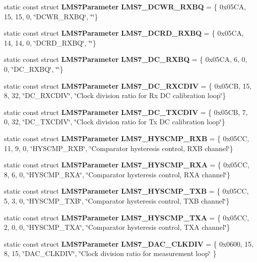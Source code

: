 \begin{DoxyCompactItemize}
\item 
static const struct {\bf L\+M\+S7\+Parameter} {\bf L\+M\+S7\+\_\+\+D\+C\+W\+R\+\_\+\+R\+X\+BQ} = \{ 0x05\+C\+A, 15, 15, 0, \char`\"{}\+D\+C\+W\+R\+\_\+\+R\+X\+B\+Q\char`\"{}, \char`\"{}\char`\"{}\}
\item 
static const struct {\bf L\+M\+S7\+Parameter} {\bf L\+M\+S7\+\_\+\+D\+C\+R\+D\+\_\+\+R\+X\+BQ} = \{ 0x05\+C\+A, 14, 14, 0, \char`\"{}\+D\+C\+R\+D\+\_\+\+R\+X\+B\+Q\char`\"{}, \char`\"{}\char`\"{}\}
\item 
static const struct {\bf L\+M\+S7\+Parameter} {\bf L\+M\+S7\+\_\+\+D\+C\+\_\+\+R\+X\+BQ} = \{ 0x05\+C\+A, 6, 0, 0, \char`\"{}\+D\+C\+\_\+\+R\+X\+B\+Q\char`\"{}, \char`\"{}\char`\"{}\}
\item 
static const struct {\bf L\+M\+S7\+Parameter} {\bf L\+M\+S7\+\_\+\+D\+C\+\_\+\+R\+X\+C\+D\+IV} = \{ 0x05\+C\+B, 15, 8, 32, \char`\"{}\+D\+C\+\_\+\+R\+X\+C\+D\+I\+V\char`\"{}, \char`\"{}\+Clock division ratio for Rx D\+C calibration loop\char`\"{}\}
\item 
static const struct {\bf L\+M\+S7\+Parameter} {\bf L\+M\+S7\+\_\+\+D\+C\+\_\+\+T\+X\+C\+D\+IV} = \{ 0x05\+C\+B, 7, 0, 32, \char`\"{}\+D\+C\+\_\+\+T\+X\+C\+D\+I\+V\char`\"{}, \char`\"{}\+Clock division ratio for Tx D\+C calibration loop\char`\"{}\}
\item 
static const struct {\bf L\+M\+S7\+Parameter} {\bf L\+M\+S7\+\_\+\+H\+Y\+S\+C\+M\+P\+\_\+\+R\+XB} = \{ 0x05\+C\+C, 11, 9, 0, \char`\"{}\+H\+Y\+S\+C\+M\+P\+\_\+\+R\+X\+B\char`\"{}, \char`\"{}\+Comparator hysteresis control, R\+X\+B channel\char`\"{}\}
\item 
static const struct {\bf L\+M\+S7\+Parameter} {\bf L\+M\+S7\+\_\+\+H\+Y\+S\+C\+M\+P\+\_\+\+R\+XA} = \{ 0x05\+C\+C, 8, 6, 0, \char`\"{}\+H\+Y\+S\+C\+M\+P\+\_\+\+R\+X\+A\char`\"{}, \char`\"{}\+Comparator hysteresis control, R\+X\+A channel\char`\"{}\}
\item 
static const struct {\bf L\+M\+S7\+Parameter} {\bf L\+M\+S7\+\_\+\+H\+Y\+S\+C\+M\+P\+\_\+\+T\+XB} = \{ 0x05\+C\+C, 5, 3, 0, \char`\"{}\+H\+Y\+S\+C\+M\+P\+\_\+\+T\+X\+B\char`\"{}, \char`\"{}\+Comparator hysteresis control, T\+X\+B channel\char`\"{}\}
\item 
static const struct {\bf L\+M\+S7\+Parameter} {\bf L\+M\+S7\+\_\+\+H\+Y\+S\+C\+M\+P\+\_\+\+T\+XA} = \{ 0x05\+C\+C, 2, 0, 0, \char`\"{}\+H\+Y\+S\+C\+M\+P\+\_\+\+T\+X\+A\char`\"{}, \char`\"{}\+Comparator hysteresis control, T\+X\+A channel\char`\"{}\}
\item 
static const struct {\bf L\+M\+S7\+Parameter} {\bf L\+M\+S7\+\_\+\+D\+A\+C\+\_\+\+C\+L\+K\+D\+IV} = \{ 0x0600, 15, 8, 15, \char`\"{}\+D\+A\+C\+\_\+\+C\+L\+K\+D\+I\+V\char`\"{}, \char`\"{}\+Clock division ratio for measurement loop\char`\"{} \}

\end{DoxyCompactItemize}
